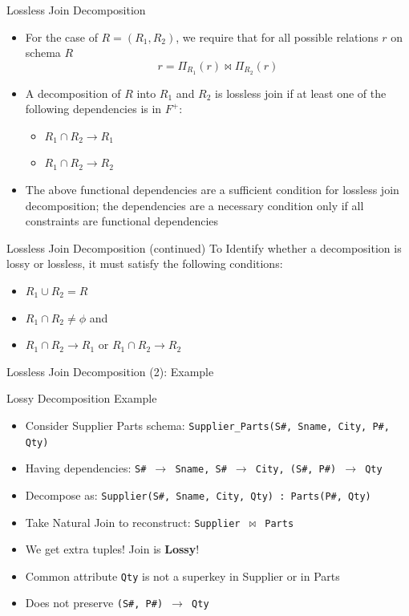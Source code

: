 \documentclass[aspectratio=169, xcolor=dvipsnames]{beamer}
\begin{document}
\begin{frame}{Lossless Join Decomposition}
    \begin{itemize}[<+->]
        \item For the case of $R = (R_1, R_2)$, we require that for all possible relations $r$ on schema $R$
        \[ r = \Pi_{R_1}(r) \bowtie \Pi_{R_2}(r) \]
        \item A decomposition of $R$ into $R_1$ and $R_2$ is lossless join if at least one of the following dependencies is in $F^+$:
        \begin{itemize}
            \item[$\triangleright$] $R_1 \cap R_2 \rightarrow R_1$
            \item[$\triangleright$] $R_1 \cap R_2 \rightarrow R_2$
        \end{itemize}
        \item The above functional dependencies are a sufficient condition for lossless join decomposition; the dependencies are a necessary condition only if all constraints are functional dependencies
    \end{itemize}
\end{frame}

\begin{frame}{Lossless Join Decomposition (continued)}
    To Identify whether a decomposition is lossy or lossless, it must satisfy the following conditions:
    \begin{itemize}[<+->]
        \item $R_1 \cup R_2 = R$
        \item $R_1 \cap R_2 \neq \phi$ and
        \item $R_1 \cap R_2 \rightarrow R_1$ or $R_1 \cap R_2 \rightarrow R_2$
    \end{itemize}
\end{frame}

\begin{frame}{Lossless Join Decomposition (2): Example}
    \begin{alertblock}{Lossy Decomposition Example}
        \begin{itemize}[<+->]
            \item Consider Supplier Parts schema: \texttt{Supplier\_Parts(S\#, Sname, City, P\#, Qty)}
            \item Having dependencies: \texttt{S\# $\rightarrow$ Sname, S\# $\rightarrow$ City, (S\#, P\#) $\rightarrow$ Qty}
            \item Decompose as: \texttt{Supplier(S\#, Sname, City, Qty) : Parts(P\#, Qty)}
            \item Take Natural Join to reconstruct: \texttt{Supplier $\bowtie$ Parts}
            \item We get extra tuples! Join is \textbf{Lossy}!
            \item Common attribute \texttt{Qty} is not a superkey in Supplier or in Parts
            \item Does not preserve \texttt{(S\#, P\#) $\rightarrow$ Qty}
        \end{itemize}
    \end{alertblock}
\end{frame}
\end{document}
